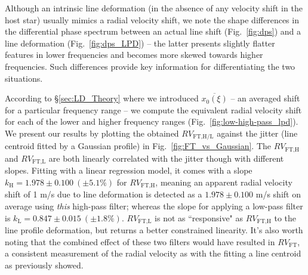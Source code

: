 Although an intrinsic line deformation (in the absence of any velocity shift in the host star) usually mimics a radial velocity shift, we note the shape differences in the differential phase spectrum between an actual line shift (Fig.~\ref{fig:dps}) and a line deformation (Fig.~\ref{fig:dps_LPD}) -- the latter presents slightly flatter features in lower frequencies and becomes more skewed towards higher frequencies. Such differences provide key information for differentiating the two situations.

According to \S\ref{sec:LD_Theory} where we introduced $\overline{x_0(\xi)}$ -- an averaged shift for a particular frequency range -- we compute the equivalent radial velocity shift for each of the lower and higher frequency ranges (Fig.~\ref{fig:low-high-pass_lpd}). We present our results by plotting the obtained $RV_\text{FT,H/L}$ against the jitter (line centroid fitted by a Gaussian profile) in Fig.~\ref{fig:FT_vs_Gaussian}. The $RV_\text{FT,H}$ and $RV_\text{FT,L}$ are both linearly correlated with the jitter though with different slopes. Fitting with a linear regression model, it comes with a slope $k_\text{H} = 1.978\pm0.100~(\pm5.1\%)$ for $RV_\text{FT,H}$, meaning an apparent radial velocity shift of 1 m/s due to line deformation is detected as a $1.978\pm0.100$ m/s shift on average using \textit{this} high-pass filter; whereas the slope for applying a low-pass filter is $k_\text{L} = 0.847\pm0.015~(\pm1.8\%)$. $RV_\text{FT,L}$ is not as ``responsive" as $RV_\text{FT,H}$ to the line profile deformation, but returns a better constrained linearity. It's also worth noting that the combined effect of these two filters would have resulted in $RV_\text{FT}$, a consistent measurement of the radial velocity as with the fitting a line centroid as previously showed.

